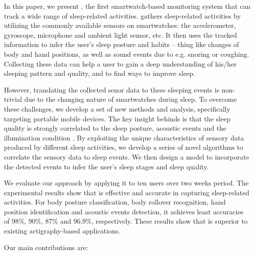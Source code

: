 
In this paper, we present \systemname, the first smartwatch-based monitoring system that can track a wide range of sleep-related
activities. \systemname gathers sleep-related activities by utilizing the commonly available sensors on smartwatches: the accelerometer,
gyroscope, microphone and ambient light sensor, etc. It then uses the tracked information to infer the user's sleep posture and habits --
thing like changes of body and hand positions, as well as sound events due to e.g. snoring or coughing.  Collecting these data can help a
user to gain a deep understanding of his/her sleeping pattern and quality, and to find ways to improve sleep.

However, translating the collected senor data to these sleeping events is non-trivial due to the changing nature of smartwatches during
sleep. To overcome these challenges, we develop a set of new methods and analysis, specifically targeting portable mobile devices.  The key
insight behinds {\systemname} is that the sleep quality is strongly correlated to the sleep posture, acoustic events and the illumination
condition \cite{shelgikar2016sleep}. By exploiting the unique characteristics of sensory data produced by different sleep activities, we develop a series of novel algorithms to correlate the sensory data to sleep events. We then design a model to incorporate the detected events to
infer the user's sleep stages and sleep quality.

We evaluate our approach by applying it to ten users over two weeks period. The experimental results show that {\systemname} is  effective and accurate in capturing sleep-related activities. For body posture classification, body rollover recognition, hand position identification and  acoustic events detection,  it achieves least accuracies of 98\%,  90\%,  87\% and  96.9\%, respectively. These results show that {\systemname}  is superior to existing actigraphy-based applications.

Our main contributions are:

